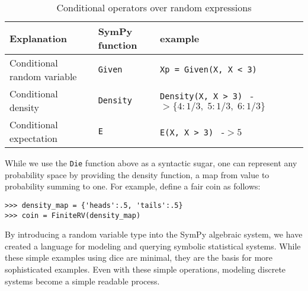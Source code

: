 \begin{table}[h]
\begin{tabular}{|lll|}
\hline
Explanation & SymPy function & example\\ \hline
Conditional random variable & {\tt Given} & {\tt Xp = Given(X, X < 3)} \\ \hline
Conditional density & {\tt Density} & {\tt Density(X, X > 3) } -$> \{4: 1/3,\; 5: 1/3,\; 6: 1/3\}$ \\ \hline
Conditional expectation  & {\tt E} & {\tt E(X, X > 3) } -$> 5$ \\ \hline
\end{tabular}
\label{tab:cond_ops}
\caption{Conditional operators over random expressions}
\end{table}

While we use the {\tt Die} function above as a syntactic sugar, one can
represent any probability space by providing the density function, a map
from value to probability summing to one. For example, define a fair coin as follows:
\begin{lstlisting}
>>> density_map = {'heads':.5, 'tails':.5}
>>> coin = FiniteRV(density_map)
\end{lstlisting}

By introducing a random variable type into the SymPy algebraic system, we have
created a language for modeling and querying symbolic statistical systems.
While these simple examples using dice are minimal, they are the basis for more
sophisticated examples.  Even with these simple operations, modeling discrete
systems become a simple readable process.
